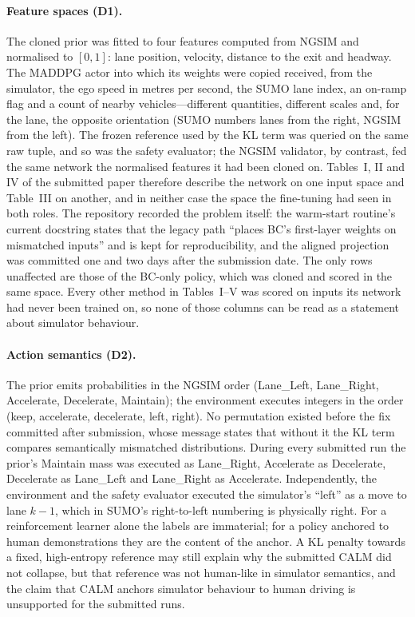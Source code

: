 \paragraph{Feature spaces (D1).}
The cloned prior was fitted to four features computed from NGSIM and normalised to $[0,1]$: lane position, velocity, distance to the exit and headway. The MADDPG actor into which its weights were copied received, from the simulator, the ego speed in metres per second, the SUMO lane index, an on-ramp flag and a count of nearby vehicles---different quantities, different scales and, for the lane, the opposite orientation (SUMO numbers lanes from the right, NGSIM from the left). The frozen reference used by the KL term was queried on the same raw tuple, and so was the safety evaluator; the NGSIM validator, by contrast, fed the same network the normalised features it had been cloned on. Tables~I, II and IV of the submitted paper therefore describe the network on one input space and Table~III on another, and in neither case the space the fine-tuning had seen in both roles. The repository recorded the problem itself: the warm-start routine's current docstring states that the legacy path ``places BC's first-layer weights on mismatched inputs'' and is kept for reproducibility, and the aligned projection was committed one and two days after the submission date. The only rows unaffected are those of the BC-only policy, which was cloned and scored in the same space. Every other method in Tables~I--V was scored on inputs its network had never been trained on, so none of those columns can be read as a statement about simulator behaviour.

\paragraph{Action semantics (D2).}
The prior emits probabilities in the NGSIM order (Lane\_Left, Lane\_Right, Accelerate, Decelerate, Maintain); the environment executes integers in the order (keep, accelerate, decelerate, left, right). No permutation existed before the fix committed after submission, whose message states that without it the KL term compares semantically mismatched distributions. During every submitted run the prior's Maintain mass was executed as Lane\_Right, Accelerate as Decelerate, Decelerate as Lane\_Left and Lane\_Right as Accelerate. Independently, the environment and the safety evaluator executed the simulator's ``left'' as a move to lane $k-1$, which in SUMO's right-to-left numbering is physically right. For a reinforcement learner alone the labels are immaterial; for a policy anchored to human demonstrations they are the content of the anchor. A KL penalty towards a fixed, high-entropy reference may still explain why the submitted CALM did not collapse, but that reference was not human-like in simulator semantics, and the claim that CALM anchors simulator behaviour to human driving is unsupported for the submitted runs.

